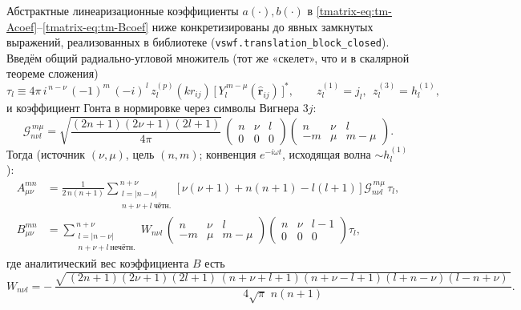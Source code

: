 \documentclass[11pt,a4paper]{article}
\begin{document}
Абстрактные линеаризационные коэффициенты $a(\cdot),b(\cdot)$ в \eqref{tmatrix-eq:tm-Acoef}--\eqref{tmatrix-eq:tm-Bcoef} ниже конкретизированы до явных замкнутых выражений, реализованных в библиотеке (\texttt{vswf.translation\_block\_closed}). Введём общий радиально-угловой множитель (тот же «скелет», что и в скалярной теореме сложения)
\begin{equation}
\tau_l \equiv 4\pi\, i^{\,n-\nu}\,(-1)^m\,(-i)^{\,l}\, z_l^{(p)}(k r_{ij})\,
\bigl[\,Y_l^{\,m-\mu}(\hat{\bm r}_{ij})\,\bigr]^{*},
\qquad z_l^{(1)}=j_l,\ \ z_l^{(3)}=h_l^{(1)},
\label{tmatrix-eq:tm-tau}
\end{equation}
и коэффициент Гонта в нормировке через символы Вигнера $3j$:
\begin{equation}
\mathcal{G}^{\,m\mu}_{n\nu l}=\sqrt{\frac{(2n+1)(2\nu+1)(2l+1)}{4\pi}}\,
\begin{pmatrix} n&\nu&l\\ 0&0&0\end{pmatrix}
\begin{pmatrix} n&\nu&l\\ -m&\mu&m-\mu\end{pmatrix}.
\label{tmatrix-eq:tm-gaunt}
\end{equation}
Тогда (источник $(\nu,\mu)$, цель $(n,m)$; конвенция $e^{-i\omega t}$, исходящая волна $\sim h_l^{(1)}$):
\begin{align}
A_{\mu\nu}^{mn} &= \frac{1}{2\,n(n+1)}
\!\!\sum_{\substack{l=|n-\nu|\\[1pt] n+\nu+l\ \mathrm{чётн.}}}^{\,n+\nu}\!\!
\bigl[\,\nu(\nu+1)+n(n+1)-l(l+1)\,\bigr]\,
\mathcal{G}^{\,m\mu}_{n\nu l}\,\tau_l,
\label{tmatrix-eq:tm-Aexplicit}\\[4pt]
B_{\mu\nu}^{mn} &=
\!\!\sum_{\substack{l=|n-\nu|\\[1pt] n+\nu+l\ \mathrm{нечётн.}}}^{\,n+\nu}\!\!
W_{n\nu l}\,
\begin{pmatrix} n&\nu&l\\ -m&\mu&m-\mu\end{pmatrix}
\begin{pmatrix} n&\nu&l-1\\ 0&0&0\end{pmatrix}\tau_l,
\label{tmatrix-eq:tm-Bexplicit}
\end{align}
где аналитический вес коэффициента $B$ есть
\begin{equation}
W_{n\nu l}=-\,\frac{\sqrt{\,(2n+1)(2\nu+1)(2l+1)\,(n{+}\nu{+}l{+}1)(n{+}\nu{-}l{+}1)(l{+}n{-}\nu)(l{-}n{+}\nu)\,}}
{4\sqrt{\pi}\,\,n(n+1)}.
\label{tmatrix-eq:tm-Wbeta}
\end{equation}
\end{document}
